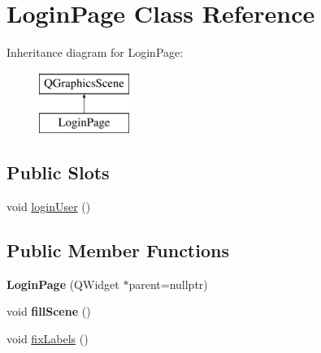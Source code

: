 \hypertarget{classLoginPage}{\section{Login\-Page Class Reference}
\label{classLoginPage}
}
Inheritance diagram for Login\-Page\-:\begin{figure}[H]
\begin{center}
\leavevmode
\includegraphics[height=2.000000cm]{classLoginPage}
\end{center}
\end{figure}
\subsection*{Public Slots}
\begin{DoxyCompactItemize}
\item 
void \hyperlink{classLoginPage_a5802453d9b965f17bad2abe14d23ff1c}{login\-User} ()
\end{DoxyCompactItemize}
\subsection*{Public Member Functions}
\begin{DoxyCompactItemize}
\item 
\hypertarget{classLoginPage_ac80d4431cd7779e6ae5f8c3b17fe6c3f}{{\bfseries Login\-Page} (Q\-Widget $\ast$parent=nullptr)}\label{classLoginPage_ac80d4431cd7779e6ae5f8c3b17fe6c3f}

\item 
\hypertarget{classLoginPage_a357fad2a91f6081a2b272ed081dcb014}{void {\bfseries fill\-Scene} ()}\label{classLoginPage_a357fad2a91f6081a2b272ed081dcb014}

\item 
void \hyperlink{classLoginPage_aaa723bfc72a1ba4778e258ba088e0d7a}{fix\-Labels} ()
\end{DoxyCompactItemize}
